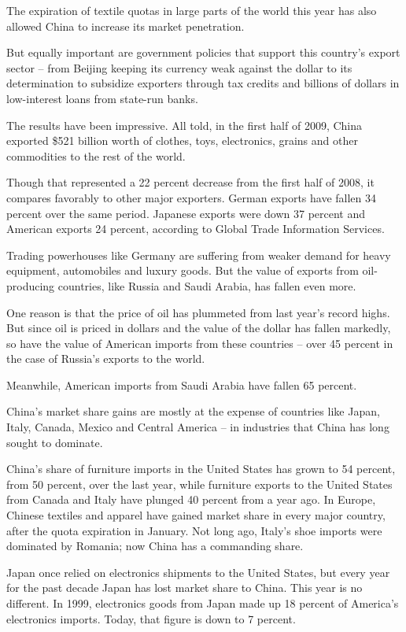 ﻿\documentclass[12pt]{article}
\begin{document}
The expiration of textile quotas in large parts of the world this year has also allowed China to
increase its market penetration.

But equally important are government policies that support this country's export sector -- from
Beijing keeping its currency weak against the dollar to its determination to subsidize exporters
through tax credits and billions of dollars in low-interest loans from state-run banks.

The results have been impressive. All told, in the first half of 2009, China exported \$521 billion
worth of clothes, toys, electronics, grains and other commodities to the rest of the world.

Though that represented a 22 percent decrease from the first half of 2008, it compares favorably to
other major exporters. German exports have fallen 34 percent over the same period. Japanese exports
were down 37 percent and American exports 24 percent, according to Global Trade Information
Services.

Trading powerhouses like Germany are suffering from weaker demand for heavy equipment, automobiles
and luxury goods. But the value of exports from oil-producing countries, like Russia and Saudi
Arabia, has fallen even more.

One reason is that the price of oil has plummeted from last year's record highs. But since oil is
priced in dollars and the value of the dollar has fallen markedly, so have the value of American
imports from these countries -- over 45 percent in the case of Russia's exports to the world.

Meanwhile, American imports from Saudi Arabia have fallen 65 percent.

China's market share gains are mostly at the expense of countries like Japan, Italy, Canada, Mexico
and Central America -- in industries that China has long sought to dominate.

China's share of furniture imports in the United States has grown to 54 percent, from 50 percent,
over the last year, while furniture exports to the United States from Canada and Italy have plunged
40 percent from a year ago. In Europe, Chinese textiles and apparel have gained market share in
every major country, after the quota expiration in January. Not long ago, Italy's shoe imports were
dominated by Romania; now China has a commanding share.

Japan once relied on electronics shipments to the United States, but every year for the past decade
Japan has lost market share to China. This year is no different. In 1999, electronics goods from
Japan made up 18 percent of America's electronics imports. Today, that figure is down to 7 percent.
\end{document}
